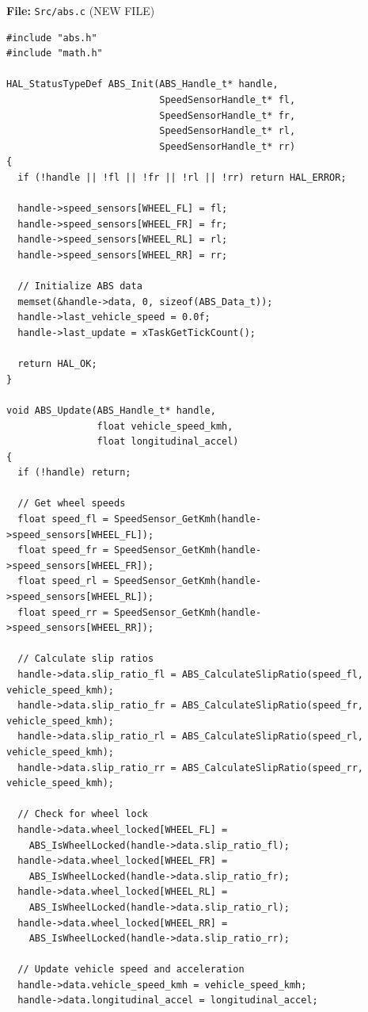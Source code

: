 \documentclass[11pt,a4paper]{article}
\begin{document}
\textbf{File:} \texttt{Src/abs.c} (NEW FILE)

\begin{lstlisting}[caption=ABS System Implementation, label=lst:absc]
#include "abs.h"
#include "math.h"

HAL_StatusTypeDef ABS_Init(ABS_Handle_t* handle,
                           SpeedSensorHandle_t* fl,
                           SpeedSensorHandle_t* fr,
                           SpeedSensorHandle_t* rl,
                           SpeedSensorHandle_t* rr)
{
  if (!handle || !fl || !fr || !rl || !rr) return HAL_ERROR;
  
  handle->speed_sensors[WHEEL_FL] = fl;
  handle->speed_sensors[WHEEL_FR] = fr;
  handle->speed_sensors[WHEEL_RL] = rl;
  handle->speed_sensors[WHEEL_RR] = rr;
  
  // Initialize ABS data
  memset(&handle->data, 0, sizeof(ABS_Data_t));
  handle->last_vehicle_speed = 0.0f;
  handle->last_update = xTaskGetTickCount();
  
  return HAL_OK;
}

void ABS_Update(ABS_Handle_t* handle, 
                float vehicle_speed_kmh,
                float longitudinal_accel)
{
  if (!handle) return;
  
  // Get wheel speeds
  float speed_fl = SpeedSensor_GetKmh(handle->speed_sensors[WHEEL_FL]);
  float speed_fr = SpeedSensor_GetKmh(handle->speed_sensors[WHEEL_FR]);
  float speed_rl = SpeedSensor_GetKmh(handle->speed_sensors[WHEEL_RL]);
  float speed_rr = SpeedSensor_GetKmh(handle->speed_sensors[WHEEL_RR]);
  
  // Calculate slip ratios
  handle->data.slip_ratio_fl = ABS_CalculateSlipRatio(speed_fl, vehicle_speed_kmh);
  handle->data.slip_ratio_fr = ABS_CalculateSlipRatio(speed_fr, vehicle_speed_kmh);
  handle->data.slip_ratio_rl = ABS_CalculateSlipRatio(speed_rl, vehicle_speed_kmh);
  handle->data.slip_ratio_rr = ABS_CalculateSlipRatio(speed_rr, vehicle_speed_kmh);
  
  // Check for wheel lock
  handle->data.wheel_locked[WHEEL_FL] = 
    ABS_IsWheelLocked(handle->data.slip_ratio_fl);
  handle->data.wheel_locked[WHEEL_FR] = 
    ABS_IsWheelLocked(handle->data.slip_ratio_fr);
  handle->data.wheel_locked[WHEEL_RL] = 
    ABS_IsWheelLocked(handle->data.slip_ratio_rl);
  handle->data.wheel_locked[WHEEL_RR] = 
    ABS_IsWheelLocked(handle->data.slip_ratio_rr);
  
  // Update vehicle speed and acceleration
  handle->data.vehicle_speed_kmh = vehicle_speed_kmh;
  handle->data.longitudinal_accel = longitudinal_accel;
  

\end{lstlisting}
\end{document}
